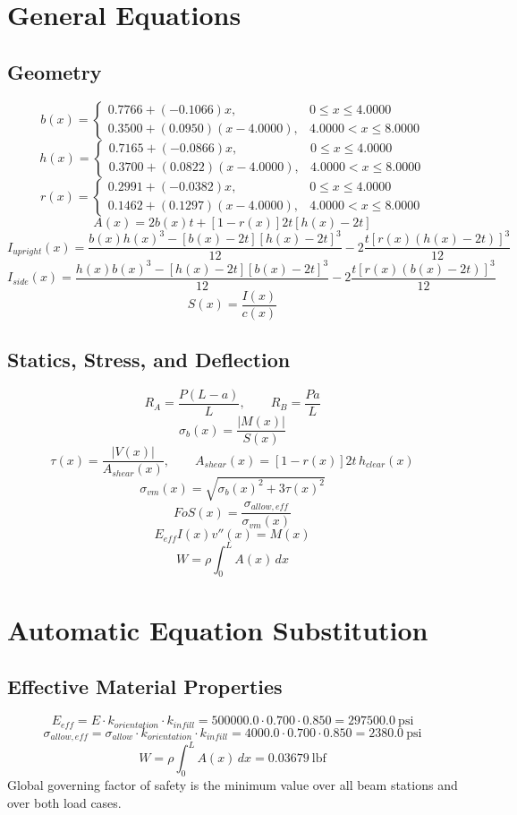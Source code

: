 \documentclass[11pt]{article}
\begin{document}
\section*{General Equations}
\subsection*{Geometry}
\[
b(x)=\begin{cases}0.7766 + (-0.1066)x, & 0 \le x \le 4.0000\\0.3500 + (0.0950)(x-4.0000), & 4.0000 < x \le 8.0000\end{cases}
\]
\[
h(x)=\begin{cases}0.7165 + (-0.0866)x, & 0 \le x \le 4.0000\\0.3700 + (0.0822)(x-4.0000), & 4.0000 < x \le 8.0000\end{cases}
\]
\[
r(x)=\begin{cases}0.2991 + (-0.0382)x, & 0 \le x \le 4.0000\\0.1462 + (0.1297)(x-4.0000), & 4.0000 < x \le 8.0000\end{cases}
\]
\[
A(x)=2b(x)t+[1-r(x)]2t[h(x)-2t]
\]
\[
I_{upright}(x)=\frac{b(x)h(x)^3-[b(x)-2t][h(x)-2t]^3}{12}-2\frac{t[r(x)(h(x)-2t)]^3}{12}
\]
\[
I_{side}(x)=\frac{h(x)b(x)^3-[h(x)-2t][b(x)-2t]^3}{12}-2\frac{t[r(x)(b(x)-2t)]^3}{12}
\]
\[
S(x)=\frac{I(x)}{c(x)}
\]

\subsection*{Statics, Stress, and Deflection}
\[
R_A=\frac{P(L-a)}{L}, \qquad R_B=\frac{Pa}{L}
\]
\[
\sigma_b(x)=\frac{|M(x)|}{S(x)}
\]
\[
\tau(x)=\frac{|V(x)|}{A_{shear}(x)}, \qquad A_{shear}(x)=[1-r(x)]2t\,h_{clear}(x)
\]
\[
\sigma_{vm}(x)=\sqrt{\sigma_b(x)^2+3\tau(x)^2}
\]
\[
FoS(x)=\frac{\sigma_{allow,eff}}{\sigma_{vm}(x)}
\]
\[
E_{eff}I(x)v''(x)=M(x)
\]
\[
W=\rho\int_0^L A(x)\,dx
\]

\section*{Automatic Equation Substitution}
\subsection*{Effective Material Properties}
\[E_{eff} = E \cdot k_{orientation} \cdot k_{infill} = 500000.0 \cdot 0.700 \cdot 0.850 = 297500.0\ \mathrm{psi}\]
\[\sigma_{allow,eff} = \sigma_{allow} \cdot k_{orientation} \cdot k_{infill} = 4000.0 \cdot 0.700 \cdot 0.850 = 2380.0\ \mathrm{psi}\]
\[W = \rho \int_0^L A(x)\,dx = 0.03679\ \mathrm{lbf}\]
Global governing factor of safety is the minimum value over all beam stations and over both load cases.
\end{document}
